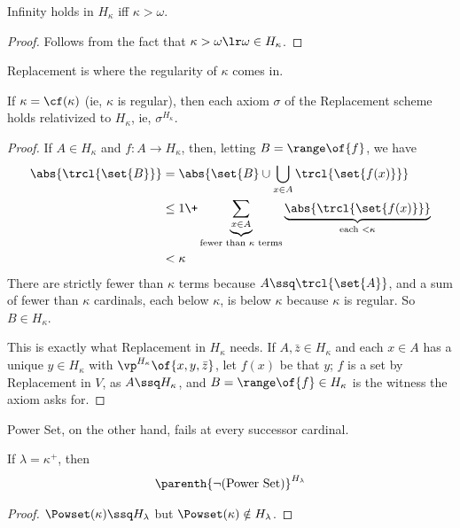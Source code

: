 \begin{boxlemma}
    Infinity holds in $H_{\kappa}$ iff $\kappa > \omega$.
\end{boxlemma}
\begin{proof}
    Follows from the fact that $\kappa > \omega \lr \omega \in H_{\kappa}$.
\end{proof}

Replacement is where the regularity of $\kappa$ comes in.

\begin{boxlemma} \label{Ch3:Lemma:H_Kappa_Replacement}
    If $\kappa = \cf(\kappa)$ (ie, $\kappa$ is regular), then each axiom $\sigma$ of the Replacement scheme holds relativized to $H_{\kappa}$, ie, $\sigma^{H_{\kappa}}$.
\end{boxlemma}
\begin{proof}
    If $A \in H_{\kappa}$ and $f : A \to H_{\kappa}$, then, letting $B = \range\of{f}$, we have
    \begin{align*}
        \abs{\trcl{\set{B}}}
        &= \abs{\set{B} \cup \bigcup_{x \in A} \trcl{\set{f(x)}}} \\
        &\leq 1 \+ \underbrace{\sum_{x \in A}}_{\text{fewer than } \kappa \text{ terms}} \underbrace{\abs{\trcl{\set{f(x)}}}}_{\text{each } < \kappa} \\
        &< \kappa
    \end{align*}
    There are strictly fewer than $\kappa$ terms because $A \ssq \trcl{\set{A}}$, and a sum of fewer than $\kappa$ cardinals, each below $\kappa$, is below $\kappa$ because $\kappa$ is regular. So $B \in H_{\kappa}$.

    This is exactly what Replacement in $H_{\kappa}$ needs. If $A, \bar{z} \in H_{\kappa}$ and each $x \in A$ has a unique $y \in H_{\kappa}$ with $\vp^{H_{\kappa}}\of{x, y, \bar{z}}$, let $f(x)$ be that $y$; $f$ is a set by Replacement in $V$, as $A \ssq H_{\kappa}$, and $B = \range\of{f} \in H_{\kappa}$ is the witness the axiom asks for.
\end{proof}

Power Set, on the other hand, fails at every successor cardinal.

\begin{boxlemma}
    If $\lambda = \kappa^+$, then
    \begin{align*}
        \parenth{\neg \text{(Power Set)}}^{H_{\lambda}}
    \end{align*}
\end{boxlemma}
\begin{proof}
    $\Powset(\kappa) \ssq H_{\lambda}$ but $\Powset(\kappa) \notin H_{\lambda}$.
\end{proof}

